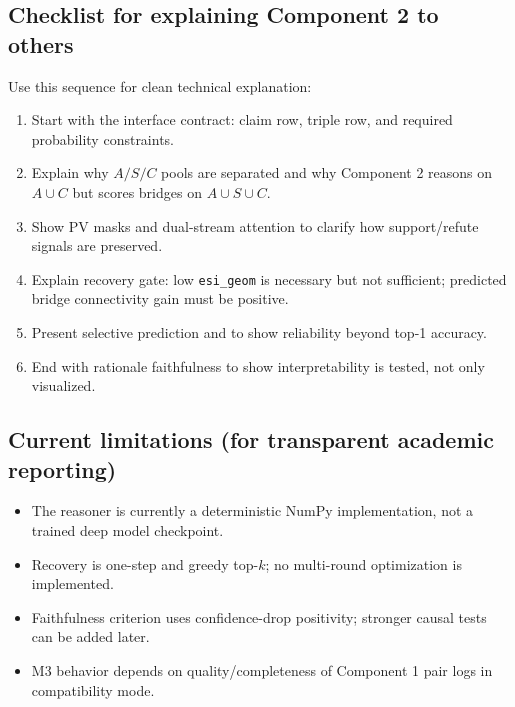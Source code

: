 \subsection{Checklist for explaining Component 2 to others}
Use this sequence for clean technical explanation:
\begin{enumerate}
\item Start with the interface contract: claim row, triple row, and required probability constraints.
\item Explain why $A/S/C$ pools are separated and why Component 2 reasons on $A\cup C$ but scores bridges on $A\cup S\cup C$.
\item Show PV masks and dual-stream attention to clarify how support/refute signals are preserved.
\item Explain recovery gate: low \texttt{esi\_geom} is necessary but not sufficient; predicted bridge connectivity gain must be positive.
\item Present selective prediction and \AURC{} to show reliability beyond top-1 accuracy.
\item End with rationale faithfulness to show interpretability is tested, not only visualized.
\end{enumerate}

\subsection{Current limitations (for transparent academic reporting)}
\begin{itemize}
\item The reasoner is currently a deterministic NumPy implementation, not a trained deep model checkpoint.
\item Recovery is one-step and greedy top-$k$; no multi-round optimization is implemented.
\item Faithfulness criterion uses confidence-drop positivity; stronger causal tests can be added later.
\item M3 behavior depends on quality/completeness of Component 1 pair logs in compatibility mode.
\end{itemize}

